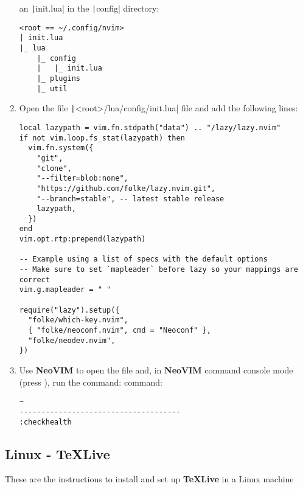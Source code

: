 \begin{enumerate}
    an \texttt|init.lua| in the \texttt|config| directory:
    \begin{verbatim}
<root == ~/.config/nvim>
| init.lua
|_ lua
    |_ config
    |   |_ init.lua
    |_ plugins
    |_ util
    \end{verbatim}
    \item Open the file \texttt|<root>/lua/config/init.lua| file and
    add the following lines:
    \begin{verbatim}
local lazypath = vim.fn.stdpath("data") .. "/lazy/lazy.nvim"
if not vim.loop.fs_stat(lazypath) then
  vim.fn.system({
    "git",
    "clone",
    "--filter=blob:none",
    "https://github.com/folke/lazy.nvim.git",
    "--branch=stable", -- latest stable release
    lazypath,
  })
end
vim.opt.rtp:prepend(lazypath)

-- Example using a list of specs with the default options
-- Make sure to set `mapleader` before lazy so your mappings are correct
vim.g.mapleader = " "

require("lazy").setup({
  "folke/which-key.nvim",
  { "folke/neoconf.nvim", cmd = "Neoconf" },
  "folke/neodev.nvim",
})
    \end{verbatim}
    \item Use \textbf{NeoVIM} to open the file and, in \textbf{NeoVIM} command
    console mode (press ), run the command:
    command:
    \begin{verbatim}
~
-------------------------------------
:checkhealth
    \end{verbatim}
\end{enumerate}


\subsection{Linux - TeXLive}

These are the instructions to install and set up \textbf{TeXLive} in a Linux machine


